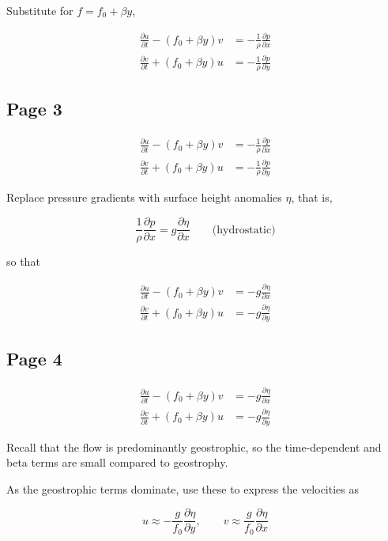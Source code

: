 \documentclass[11pt]{article}
\begin{document}
Substitute for $f=f_0+\beta y$,

\begin{align}
\frac{\partial u}{\partial t}-(f_0+\beta y)v
&=
-\frac{1}{\rho}\frac{\partial p}{\partial x}
\tag{1}\\[6pt]
\frac{\partial v}{\partial t}+(f_0+\beta y)u
&=
-\frac{1}{\rho}\frac{\partial p}{\partial y}
\tag{2}
\end{align}

\subsection*{Page 3}
\begin{align}
\frac{\partial u}{\partial t}-(f_0+\beta y)v
&=
-\frac{1}{\rho}\frac{\partial p}{\partial x}
\tag{1}\\[6pt]
\frac{\partial v}{\partial t}+(f_0+\beta y)u
&=
-\frac{1}{\rho}\frac{\partial p}{\partial y}
\tag{2}
\end{align}

Replace pressure gradients with surface height anomalies $\eta$,
that is,

\[
\frac{1}{\rho}\frac{\partial p}{\partial x}
=
g\frac{\partial \eta}{\partial x}
\qquad
\text{(hydrostatic)}
\]

so that

\begin{align}
\frac{\partial u}{\partial t}-(f_0+\beta y)v
&=
-g\frac{\partial \eta}{\partial x}
\tag{1}\\[6pt]
\frac{\partial v}{\partial t}+(f_0+\beta y)u
&=
-g\frac{\partial \eta}{\partial y}
\tag{2}
\end{align}

\subsection*{Page 4}
\begin{align}
\frac{\partial u}{\partial t}-(f_0+\beta y)v
&=
-g\frac{\partial \eta}{\partial x}
\tag{1}\\[6pt]
\frac{\partial v}{\partial t}+(f_0+\beta y)u
&=
-g\frac{\partial \eta}{\partial y}
\tag{2}
\end{align}

Recall that the flow is predominantly geostrophic, so the time-dependent
and beta terms are small compared to geostrophy.

As the geostrophic terms dominate, use these to express the velocities as

\[
u \approx -\frac{g}{f_0}\frac{\partial \eta}{\partial y},
\qquad
v \approx \frac{g}{f_0}\frac{\partial \eta}{\partial x}
\]
\end{document}

